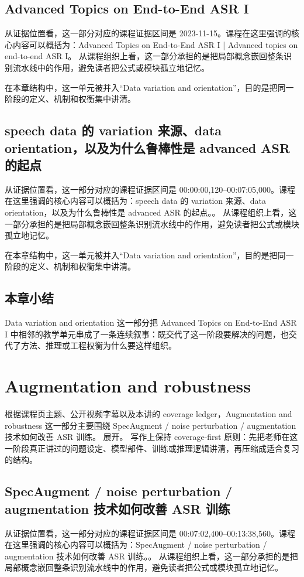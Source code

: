 \documentclass[a4paper]{article}
\begin{document}
\subsection{Advanced Topics on End-to-End ASR I}
从证据位置看，这一部分对应的课程证据区间是 2023-11-15。课程在这里强调的核心内容可以概括为：Advanced Topics on End-to-End ASR I | Advanced topics on end-to-end ASR I。
从课程组织上看，这一部分承担的是把局部概念嵌回整条识别流水线中的作用，避免读者把公式或模块孤立地记忆。

在本章结构中，这一单元被并入“Data variation and orientation”，目的是把同一阶段的定义、机制和权衡集中讲清。

\subsection{speech data 的 variation 来源、data orientation，以及为什么鲁棒性是 advanced ASR 的起点}
从证据位置看，这一部分对应的课程证据区间是 00:00:00,120--00:07:05,000。课程在这里强调的核心内容可以概括为：speech data 的 variation 来源、data orientation，以及为什么鲁棒性是 advanced ASR 的起点。。
从课程组织上看，这一部分承担的是把局部概念嵌回整条识别流水线中的作用，避免读者把公式或模块孤立地记忆。

在本章结构中，这一单元被并入“Data variation and orientation”，目的是把同一阶段的定义、机制和权衡集中讲清。

\subsection{本章小结}
Data variation and orientation 这一部分把 Advanced Topics on End-to-End ASR I 中相邻的教学单元串成了一条连续叙事：既交代了这一阶段要解决的问题，也交代了方法、推理或工程权衡为什么要这样组织。

\section{Augmentation and robustness}
根据课程页主题、公开视频字幕以及本讲的 coverage ledger，Augmentation and robustness 这一部分主要围绕 SpecAugment / noise perturbation / augmentation 技术如何改善 ASR 训练。 展开。
写作上保持 coverage-first 原则：先把老师在这一阶段真正讲过的问题设定、模型部件、训练或推理逻辑讲清，再压缩成适合复习的结构。

\subsection{SpecAugment / noise perturbation / augmentation 技术如何改善 ASR 训练}
从证据位置看，这一部分对应的课程证据区间是 00:07:02,400--00:13:38,560。课程在这里强调的核心内容可以概括为：SpecAugment / noise perturbation / augmentation 技术如何改善 ASR 训练。。
从课程组织上看，这一部分承担的是把局部概念嵌回整条识别流水线中的作用，避免读者把公式或模块孤立地记忆。
\end{document}
